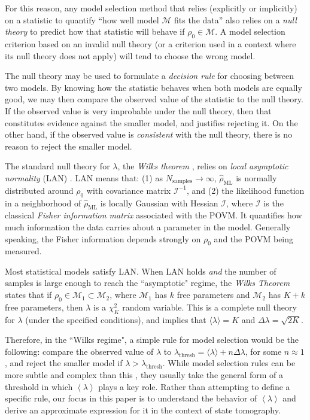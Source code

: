 \documentclass[aps,pra, twocolumn]{revtex4-1}
\newcommand{\M}{\mathcal{M}}
\newcommand{\expect}[1]{\ensuremath{\left\langle#1\right\rangle}}
\newcommand{\Fi}{\mathcal{I}}
\newcommand{\rhohat}{\hat{\rho}}
\begin{document}
For this reason, any model selection method that relies (explicitly or implicitly) on a statistic to quantify ``how well model $\M$ fits the data'' also relies on a \emph{null theory} to predict how that statistic will behave if $\rho_{0} \in \M$.  A model selection criterion based on an invalid null theory (or a criterion used in a context where its null theory does not apply) will tend to choose the wrong model.

The null theory may be used to formulate a \emph{decision rule} for choosing between two models. By knowing how the statistic behaves when both models are equally good, we may then compare the observed value of the statistic to the null theory. If the observed value is very improbable under the null theory, then that constitutes evidence against the smaller model, and justifies rejecting it. On the other hand, if the observed value is \emph{consistent} with the null theory, there is no reason to reject the smaller model.

The standard null theory for $\lambda$, the \emph{Wilks theorem} \cite{Wilks1938}, relies on \emph{local asymptotic normality} (LAN) \cite{LeCam1970, LeCam1956}. LAN means that: (1) as $N_{\mathrm{samples}}\rightarrow \infty$,  $\rhohat_{\mathrm{ML}}$ is normally distributed around $\rho_{0}$ with covariance matrix $\Fi^{-1}$, and (2) the likelihood function in a neighborhood of $\rhohat_{\mathrm{ML}}$ is locally Gaussian with Hessian $\Fi$, where $\Fi$ is the classical \emph{Fisher information matrix} associated with the POVM. It quantifies how much information the data carries about a parameter in the model. Generally speaking, the Fisher information depends strongly on $\rho_{0}$ and the POVM being measured.

Most statistical models satisfy LAN.  When LAN holds \emph{and} the number of samples is large enough to reach the ``asymptotic" regime, the \emph{Wilks Theorem} states that if $\rho_{0}\in \M_{1}\subset \M_{2}$, where $\M_{1}$ has $k$ free parameters and $\M_{2}$ has $K+k$ free parameters, then $\lambda$ is a $\chi^{2}_{K}$ random variable.  This is a complete null theory for $\lambda$ (under the specified conditions), and implies that $\langle \lambda \rangle = K$ and $\Delta \lambda = \sqrt{2K}$.

Therefore, in the ``Wilks regime", a simple rule for model selection would be the following: compare the observed value of $\lambda$ to $\lambda_{\mathrm{thresh}} = \langle \lambda \rangle + n\Delta \lambda$, for some $n \approx 1$, and reject the smaller model if $\lambda > \lambda_{\mathrm{thresh}}$.  While model selection rules can be more subtle and complex than this , they usually take the general form of a threshold in which $\expect{\lambda}$ plays a key role.  Rather than attempting to define a specific rule, our focus in this paper is to understand the behavior of $\expect{\lambda}$ and derive an approximate expression for it in the context of state tomography.
\end{document}
